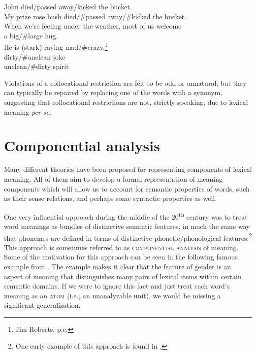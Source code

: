 \ea \label{ex:7.15}
\ea John died/passed away/kicked the bucket.\\
\ex My prize rose bush died/\#passed away/\#kicked the bucket.\\
\ex When we’re feeling under the weather, most of us welcome\\a big/\#large hug.\\
\ex He is (stark) raving mad/\#crazy.\footnote{Jim Roberts, p.c.}\\
\ex dirty/\#unclean joke\\
\ex unclean/\#dirty spirit
                       \z
\z


Violations of a collocational restriction are felt to be odd or unnatural, but they can typically be repaired by replacing one of the words with a synonym, suggesting that collocational restrictions are not, strictly speaking, due to lexical meaning \textit{per se}.


\section{Componential analysis}\label{sec:7.4}

Many different theories have been proposed for representing components of lexical meaning. All of them aim to develop a formal representation of meaning components which will allow us to account for semantic properties of words, such as their sense relations, and perhaps some syntactic properties as well.


\begin{sloppypar}
One very influential approach during the middle of the 20\textsuperscript{th} century was to treat word meanings as bundles of distinctive semantic features, in much the same way that phonemes are defined in terms of distinctive phonetic\slash phonological features.\footnote{One early example of this approach is found in \citet{Nida1951}.} This approach is sometimes referred to as \textsc{componential analysis} of meaning. Some of the motivation for this approach can be seen in the following famous example from \citet{Hjelmslev1953}. The example makes it clear that the feature of gender is an aspect of meaning that distinguishes many pairs of lexical items within certain semantic domains. If we were to ignore this fact and just treat each word’s meaning as an \textsc{atom} (i.e., an unanalyzable unit), we would be missing a significant generalization.
\end{sloppypar}


